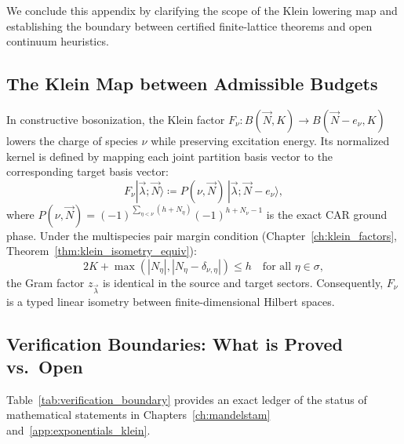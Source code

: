 We conclude this appendix by clarifying the scope of the Klein lowering map and establishing the boundary between certified finite-lattice theorems and open continuum heuristics.

\subsection{The Klein Map between Admissible Budgets}
In constructive bosonization, the Klein factor $F_\nu : B(\vec{N}, K) \to B(\vec{N}-e_\nu, K)$ lowers the charge of species $\nu$ while preserving excitation energy.
Its normalized kernel is defined by mapping each joint partition basis vector to the corresponding target basis vector:
\begin{equation}
F_\nu |\vec{\lambda}; \vec{N}\rangle \coloneqq P(\nu, \vec{N})\, |\vec{\lambda}; \vec{N}-e_\nu\rangle,
\end{equation}
where $P(\nu, \vec{N}) = (-1)^{\sum_{\eta < \nu} (h + N_\eta)} (-1)^{h + N_\nu - 1}$ is the exact CAR ground phase.
Under the multispecies pair margin condition (Chapter~\ref{ch:klein_factors}, Theorem~\ref{thm:klein_isometry_equiv}):
\[
2K + \max(|N_\eta|, |N_\eta - \delta_{\nu, \eta}|) \le h \quad \text{for all } \eta \in \sigma,
\]
the Gram factor $z_{\vec{\lambda}}$ is identical in the source and target sectors.
Consequently, $F_\nu$ is a typed linear isometry between finite-dimensional Hilbert spaces.

\subsection{Verification Boundaries: What is Proved vs.\ Open}
Table~\ref{tab:verification_boundary} provides an exact ledger of the status of mathematical statements in Chapters~\ref{ch:mandelstam} and~\ref{app:exponentials_klein}.

